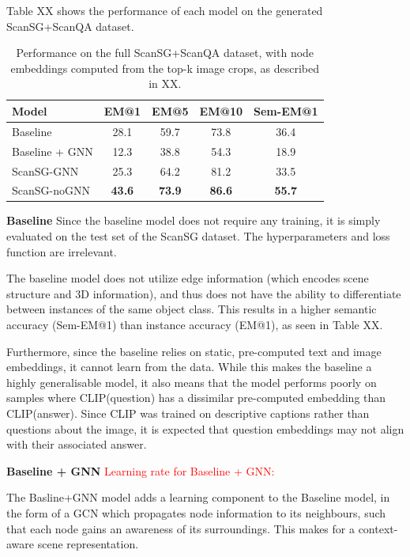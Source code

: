 Table XX shows the performance of each model on the generated ScanSG+ScanQA dataset.

\begin{table}[h!]
    \centering
    \caption{Performance on the full ScanSG+ScanQA dataset, with node embeddings computed from the top-k image crops, as described in XX.}
    \begin{tabular}{|l|c|c|c|c|}
    \hline
    \textbf{Model}         & \textbf{EM@1} & \textbf{EM@5} & \textbf{EM@10} & \textbf{Sem-EM@1} \\ \hline
    Baseline               & 28.1 & 59.7 & 73.8 & 36.4  \\ \hline
    Baseline + GNN         & 12.3 & 38.8 & 54.3 & 18.9  \\ \hline
    ScanSG-GNN             & 25.3 & 64.2 & 81.2 & 33.5 \\ \hline
    ScanSG-noGNN           & \textbf{43.6} & \textbf{73.9} & \textbf{86.6} & \textbf{55.7} \\ \hline
    \end{tabular}
\end{table}

\bigskip \noindent
\textbf{Baseline}
Since the baseline model does not require any training, it is simply evaluated on the test set of the ScanSG dataset. The hyperparameters and loss function are irrelevant.

The baseline model does not utilize edge information (which encodes scene structure and 3D information), and thus does not have the ability to differentiate between instances of the same object class. This results in a higher semantic accuracy (Sem-EM@1) than instance accuracy (EM@1), as seen in Table XX.

Furthermore, since the baseline relies on static, pre-computed text and image embeddings, it cannot learn from the data. While this makes the baseline a highly generalisable model, it also means that the model performs poorly on samples where CLIP(question) has a dissimilar pre-computed embedding than CLIP(answer). Since CLIP was trained on descriptive captions rather than questions about the image, it is expected that question embeddings may not align with their associated answer.


\bigskip \noindent
\textbf{Baseline + GNN}
\textcolor{red}{Learning rate for Baseline + GNN:}

The Basline+GNN model adds a learning component to the Baseline model, in the form of a GCN which propagates node information to its neighbours, such that each node gains an awareness of its surroundings. This makes for a context-aware scene representation.

